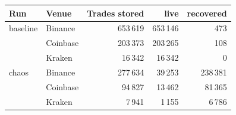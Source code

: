 \begin{tabular}{llrrr}
\toprule
Run & Venue & Trades stored & live & recovered \\
\midrule
baseline & Binance & 653\,619 & 653\,146 & 473 \\
 & Coinbase & 203\,373 & 203\,265 & 108 \\
 & Kraken & 16\,342 & 16\,342 & 0 \\
\midrule
chaos & Binance & 277\,634 & 39\,253 & 238\,381 \\
 & Coinbase & 94\,827 & 13\,462 & 81\,365 \\
 & Kraken & 7\,941 & 1\,155 & 6\,786 \\
\bottomrule
\end{tabular}
